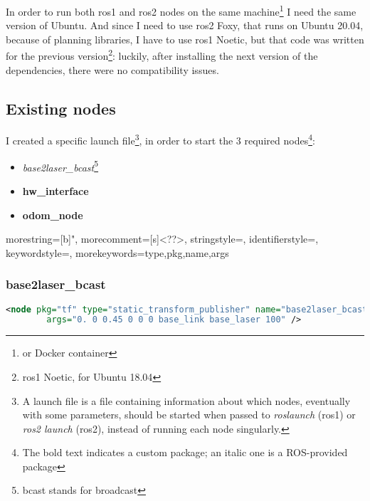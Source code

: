 In order to run both \Acrshort{ros}1 and \Acrshort{ros}2 nodes on the same machine\footnote{or Docker container} I need the same version of Ubuntu. And since I need to use \Acrshort{ros}2 Foxy, that runs on Ubuntu 20.04, because of planning libraries, I have to use \Acrshort{ros}1 Noetic, but that code was written for the previous version\footnote{\Acrshort{ros}1 Noetic, for Ubuntu 18.04}: luckily, after installing the next version of the dependencies, there were no compatibility issues.

\subsection{Existing nodes}
\label{subsec:nodes}

I created a specific launch file\footnote{A launch file is a file containing information about which nodes, eventually with some parameters, should be started when passed to {\it roslaunch} (\Acrshort{ros}1) or {\it ros2 launch} (\Acrshort{ros}2), instead of running each node singularly.}, in order to start the 3 required nodes\footnote{The bold text indicates a custom package; an italic one is a ROS-provided package}:

\begin{itemize}
    \item {\it base2laser\_bcast}\footnote{bcast stands for broadcast}
    \item {\bf hw\_interface}
    \item {\bf odom\_node}
\end{itemize}

  
  {
    morestring=[b]",
    morecomment=[s]{<?}{?>},
    stringstyle=\color{Orange},
    identifierstyle=\color{Red},
    keywordstyle=\color{Black},
    morekeywords={type,pkg,name,args}%
  }

\subsubsection{base2laser\_bcast}

\begin{lstlisting}[language=XML]
    <node pkg="tf" type="static_transform_publisher" name="base2laser_bcast"
        args="0. 0 0.45 0 0 0 base_link base_laser 100" />
\end{lstlisting}

